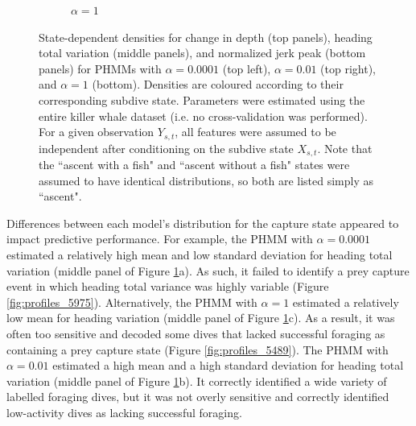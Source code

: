 \begin{figure}
\begin{subfigure}[t]{0.9\textwidth}
        \caption{$\alpha = 1$}
    \end{subfigure}
    \caption{State-dependent densities for change in depth (top panels), heading total variation (middle panels), and normalized jerk peak (bottom panels) for PHMMs with $\alpha = 0.0001$ (top left), $\alpha = 0.01$ (top right), and $\alpha = 1$ (bottom). Densities are coloured according to their corresponding subdive state. Parameters were estimated using the entire killer whale dataset (i.e. no cross-validation was performed). For a given observation $Y_{s,t}$, all features were assumed to be independent after conditioning on the subdive state $X_{s,t}$. Note that the ``ascent with a fish" and ``ascent without a fish" states were assumed to have identical distributions, so both are listed simply as ``ascent".}
    \label{fig:emissions}
\end{figure}


Differences between each model's distribution for the capture state appeared to impact predictive performance. 
%
For example, the PHMM with $\alpha = 0.0001$ estimated a relatively high mean and low standard deviation for heading total variation (middle panel of Figure \ref{fig:emissions}a). As such, it failed to identify a prey capture event in which heading total variance was highly variable (Figure \ref{fig:profiles_5975}).
%
Alternatively, the PHMM with $\alpha = 1$ estimated a relatively low mean for heading variation (middle panel of Figure \ref{fig:emissions}c). As a result, it was often too sensitive and decoded some dives that lacked successful foraging as containing a prey capture state (Figure \ref{fig:profiles_5489}). 
%
The PHMM with $\alpha = 0.01$ estimated a high mean and a high standard deviation for heading total variation (middle panel of Figure \ref{fig:emissions}b). It correctly identified a wide variety of labelled foraging dives, but it was not overly sensitive and correctly identified low-activity dives as lacking successful foraging.

